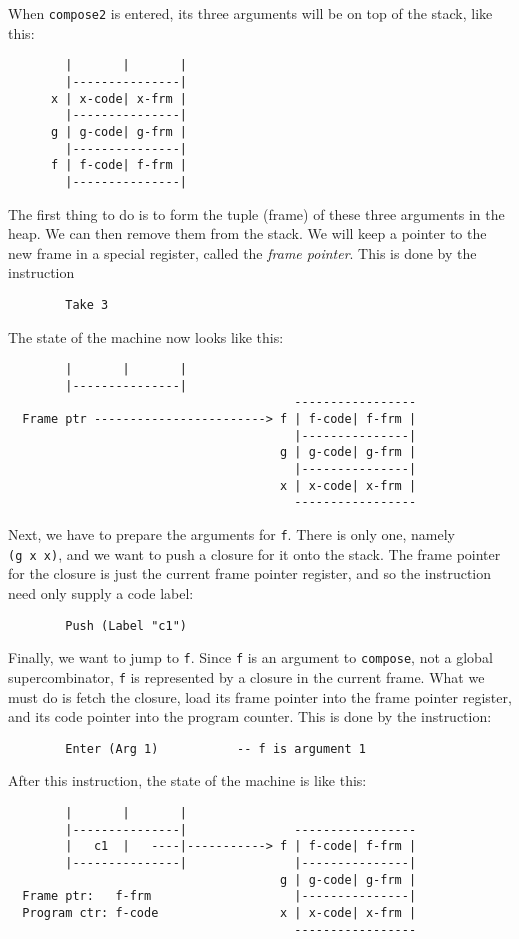 When \mbox{\tt compose2} is entered, its three arguments will be on top of the stack,
like this:
\begin{verbatim}
        |       |       |
        |---------------|
      x | x-code| x-frm |
        |---------------|
      g | g-code| g-frm |
        |---------------|
      f | f-code| f-frm |
        |---------------|
\end{verbatim}
The first thing to do is to form the tuple (frame)
of these three arguments in the
heap.  We can then remove them from the stack.  We will keep a pointer to the
new frame in a special register, called the {\em frame pointer}.
This is done by the instruction
\begin{verbatim}
        Take 3
\end{verbatim}
The state of the machine now looks like this:
\begin{verbatim}
        |       |       |
        |---------------|
                                        -----------------
  Frame ptr ------------------------> f | f-code| f-frm |
                                        |---------------|
                                      g | g-code| g-frm |
                                        |---------------|
                                      x | x-code| x-frm |
                                        -----------------
\end{verbatim}

Next, we have to prepare the arguments for \mbox{\tt f}.  There is only one, namely
\mbox{\tt (g\ x\ x)}, and we want to push a
closure for it onto the stack.  The frame pointer
for the closure is just the current frame pointer register, and so
the instruction need only supply a code label:
\begin{verbatim}
        Push (Label "c1")
\end{verbatim}

Finally, we want to jump to \mbox{\tt f}.  Since \mbox{\tt f} is an argument to \mbox{\tt compose},
not a global supercombinator, \mbox{\tt f} is represented by a closure
in the current frame. What we must
do is fetch the closure,
load its frame pointer into the frame pointer register, and
its code pointer into the program counter.
This is done by the instruction:
\begin{verbatim}
        Enter (Arg 1)           -- f is argument 1
\end{verbatim}
After this instruction, the state of the machine is like this:
\begin{verbatim}
        |       |       |
        |---------------|               -----------------
        |   c1  |   ----|-----------> f | f-code| f-frm |
        |---------------|               |---------------|
                                      g | g-code| g-frm |
  Frame ptr:   f-frm                    |---------------|
  Program ctr: f-code                 x | x-code| x-frm |
                                        -----------------
\end{verbatim}

